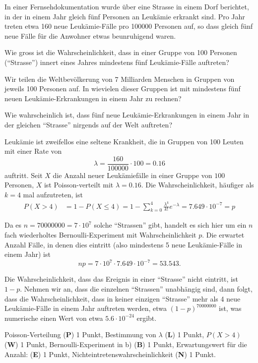 In einer Fernsehdokumentation wurde über eine Strasse in einem Dorf berichtet,
in der in einem Jahr gleich fünf Personen an Leukämie erkrankt sind.
Pro Jahr treten etwa 160 neue Leukämie-Fälle pro 100000 Personen auf,
so dass gleich fünf neue Fälle für die Anwohner etwas beunruhigend
waren.
\begin{teilaufgaben}
\item
Wie gross ist die Wahrscheinlichkeit, dass in einer Gruppe von
100 Personen (``Strasse'') innert eines Jahres mindestens fünf
Leukämie-Fälle auftreten?
\item
Wir teilen die Weltbevölkerung von 7 Milliarden Menschen
in Gruppen von jeweils 100 Personen auf.
In wievielen dieser Gruppen ist mit mindestens fünf neuen
Leukämie-Erkrankungen in einem Jahr zu rechnen?
\item
Wie wahrscheinlich ist, dass fünf neue Leukämie-Erkrankungen in einem 
Jahr in der gleichen ``Strasse'' nirgends auf der Welt auftreten?
\end{teilaufgaben}

\begin{loesung}
\begin{teilaufgaben}
\item
Leukämie ist zweifellos eine seltene Krankheit, die in Gruppen von 
100 Leuten mit einer Rate von 
\[
\lambda = \frac{160}{100000}\cdot 100=0.16
\]
auftritt.
Seit $X$ die Anzahl neuer Leukämiefälle in einer Gruppe von $100$
Personen, $X$ ist Poisson-verteilt mit $\lambda=0.16$.
Die Wahrscheinlichkeit, häufiger als $k=4$ mal aufzutreten, ist
\begin{align*}
P(X>4)
&=
1-P(X\le 4)
=
1-\sum_{k=0}^4 \frac{\lambda^k}{k!}e^{-\lambda}
=
7.649\cdot10^{-7}=p
\end{align*}
\item
Da es $n=70000000=7\cdot 10^7$ solche ``Strassen'' gibt, handelt es sich hier um
ein $n$ fach wiederholtes Bernoulli-Experiment mit Wahrscheinlichkeit $p$.
Die erwartet Anzahl Fälle, in denen dies eintritt (also mindestens 5
neue Leukämie-Fälle in einem Jahr) ist
\[
np=7\cdot 10^7\cdot 7.649\cdot 10^{-7}=53.543.
\]
\item
Die Wahrscheinlichkeit, dass das Ereignis in einer ``Strasse'' nicht eintritt,
ist $1-p$.
Nehmen wir an, dass die einzelnen ``Strassen'' unabhängig sind, dann
folgt, dass die Wahrscheinlichkeit, dass in keiner einzigen ``Strasse''
mehr als 4 neue Leukämie-Fälle in einem Jahr auftreten werden, 
etwa $(1-p)^{70000000}$ ist, was numerische einen Wert von etwa
$5.6\cdot 10^{-24}$ ergibt.
\qedhere
\end{teilaufgaben}
\end{loesung}

\begin{bewertung}
Poisson-Verteilung ({\bf P}) 1 Punkt,
Bestimmung von $\lambda$ ({\bf L}) 1 Punkt,
$P(X>4)$ ({\bf W}) 1 Punkt,
Bernoulli-Experiment in b) ({\bf B}) 1 Punkt,
Erwartungswert für die Anzahl: ({\bf E}) 1 Punkt,
Nichteintretenswahrscheinlichkeit ({\bf N}) 1 Punkt.
\end{bewertung}



